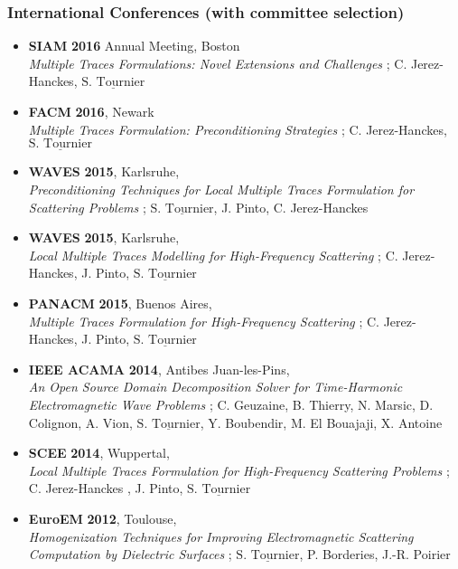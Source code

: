 \documentclass[a4paper,10pt,twoside]{article}
\newcommand\moi{$\underline{\textrm{S. Tournier}}$}
\begin{document}
\subsubsection*{International Conferences (with committee selection)}
\noindent
\begin{itemize}
\item[\textbullet]
  \textbf{SIAM} \textbf{2016} Annual Meeting, Boston\\
  \emph{Multiple Traces Formulations: Novel Extensions and Challenges} ;
  C. Jerez-Hanckes, \moi

\item[\textbullet]
  \textbf{FACM} \textbf{2016}, Newark\\
  \emph{Multiple Traces Formulation: Preconditioning Strategies} ;
  C. Jerez-Hanckes, \moi

\item[\textbullet]
  \textbf{WAVES} \textbf{2015}, Karlsruhe,\\
  \emph{Preconditioning Techniques
    for Local Multiple Traces Formulation for Scattering Problems} ;
  \moi,  J. Pinto, C. Jerez-Hanckes

\item[\textbullet]
  \textbf{WAVES} \textbf{2015}, Karlsruhe,\\
  \emph{Local Multiple Traces Modelling for High-Frequency Scattering} ;
  C. Jerez-Hanckes, J. Pinto, \moi

\item[\textbullet]
  \textbf{PANACM} \textbf{2015}, Buenos Aires,\\
  \emph{Multiple Traces Formulation for High-Frequency Scattering} ;
  C. Jerez-Hanckes, J. Pinto, \moi

\item[\textbullet]
  \textbf{IEEE ACAMA} \textbf{2014}, Antibes Juan-les-Pins,\\
  \emph{An Open Source Domain Decomposition Solver for
    Time-Harmonic Electromagnetic Wave Problems} ;
  C. Geuzaine, B. Thierry, N. Marsic, D. Colignon, A. Vion, \moi,
  Y. Boubendir, M. El Bouajaji, X. Antoine

\item[\textbullet]
  \textbf{SCEE} \textbf{2014}, Wuppertal,\\
  \emph{Local Multiple Traces Formulation for High-Frequency Scattering
    Problems} ;
  C. Jerez-Hanckes , J. Pinto, \moi

\item[\textbullet]
  \textbf{EuroEM} \textbf{2012}, Toulouse,\\
  \emph{Homogenization  Techniques for Improving Electromagnetic
    Scattering Computation by Dielectric Surfaces} ;
  \moi, P. Borderies, J.-R. Poirier


\end{itemize}
\end{document}
